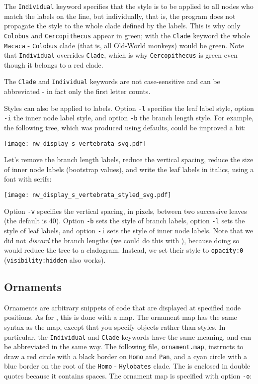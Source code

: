 The \texttt{Individual} keyword specifies that the style is to be applied to all nodes who match the labels on the line, but individually, that is, the program does not propagate the style to the whole clade defined by the labels. This is why only \texttt{Colobus} and \texttt{Cercopithecus} appear in green; with the \texttt{Clade} keyword the whole \texttt{Macaca} - \texttt{Colobus} clade (that is, all Old-World monkeys) would be green. Note that \texttt{Individual} overrides \texttt{Clade}, which is why \texttt{Cercopithecus} is green even though it belongs to a red clade.

The \texttt{Clade} and \texttt{Individual} keywords are not case-sensitive and can be abbreviated - in fact only the first letter counts.

Styles can also be applied to labels. Option \texttt{-l} specifies the leaf
label style, option \texttt{-i} the inner node label style, and option
\texttt{-b} the branch length style. For example, the following tree, which was
produced using defaults, could be improved a bit:


\begin{center}
  \texttt{[image: nw\_display\_s\_vertebrata\_svg.pdf]}
\end{center}

\noindent{}Let's remove the branch length labels, reduce
the vertical spacing, reduce the size of inner node labels (bootstrap values),
and write the leaf labels in italics, using a font with serifs:

\begin{center}
  \texttt{[image: nw\_display\_s\_vertebrata\_styled\_svg.pdf]}
\end{center}
Option \texttt{-v} specifies the vertical spacing, in pixels, between two
successive leaves (the default is 40). Option \texttt{-b} sets the style of
branch labels, option \texttt{-l} sets the style of leaf labels, and option
\texttt{-i} sets the style of inner node labels. Note that we did not
\emph{discard} the branch lengths (we could do this with \topology), because
doing so would reduce the tree to a cladogram. Instead, we set their \css{}
style to \texttt{opacity:0} (\texttt{visibility:hidden} also works).

\subsection{Ornaments}

Ornaments are arbitrary snippets of \svg{} code that are displayed at specified
node positions. As for \css, this is done with a map. The ornament map has the
same syntax as the \css{} map, except that you specify \svg{} objects rather
than \css{} styles. In particular, the \texttt{Individual} and \texttt{Clade}
keywords have the same meaning, and can be abbreviated in the same way. The
following file, \texttt{ornament.map}, instructs to draw a red circle with a
black border on \texttt{Homo} and \texttt{Pan}, and a cyan circle with a blue
border on the root of the \texttt{Homo} - \texttt{Hylobates} clade. The \svg{} is enclosed in double quotes because it contains spaces. The
ornament map is specified with option \texttt{-o}:
				
